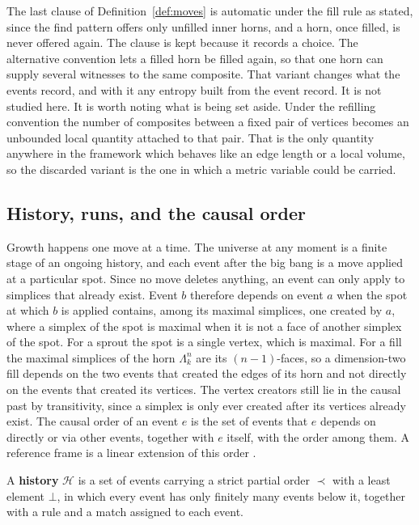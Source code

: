 \begin{remark}
\label{rem:atmostonce}
The last clause of Definition~\ref{def:moves} is automatic under the fill rule as stated, since the find pattern offers only unfilled inner horns, and a horn, once filled, is never offered again.
The clause is kept because it records a choice.
The alternative convention lets a filled horn be filled again, so that one horn can supply several witnesses to the same composite.
That variant changes what the events record, and with it any entropy built from the event record.
It is not studied here.
It is worth noting what is being set aside.
Under the refilling convention the number of composites between a fixed pair of vertices becomes an unbounded local quantity attached to that pair.
That is the only quantity anywhere in the framework which behaves like an edge length or a local volume, so the discarded variant is the one in which a metric variable could be carried.
\end{remark}

\subsection{History, runs, and the causal order}

Growth happens one move at a time.
The universe at any moment is a finite stage of an ongoing history, and each event after the big bang is a move applied at a particular spot.
Since no move deletes anything, an event can only apply to simplices that already exist.
Event $b$ therefore depends on event $a$ when the spot at which $b$ is applied contains, among its maximal simplices, one created by $a$, where a simplex of the spot is maximal when it is not a face of another simplex of the spot.
For a sprout the spot is a single vertex, which is maximal.
For a fill the maximal simplices of the horn $\Lambda^n_k$ are its $(n-1)$-faces, so a dimension-two fill depends on the two events that created the edges of its horn and not directly on the events that created its vertices.
The vertex creators still lie in the causal past by transitivity, since a simplex is only ever created after its vertices already exist.
The causal order of an event $e$ is the set of events that $e$ depends on directly or via other events, together with $e$ itself, with the order among them.
A reference frame is a linear extension of this order \citep{davey2002lattices}.

\begin{definition}[History]
\label{def:history}
A \textbf{history} $\mathcal{H}$ is a set of events carrying a strict partial order $\prec$ with a least element $\bot$, in which every event has only finitely many events below it, together with a rule and a match assigned to each event.
\end{definition}

